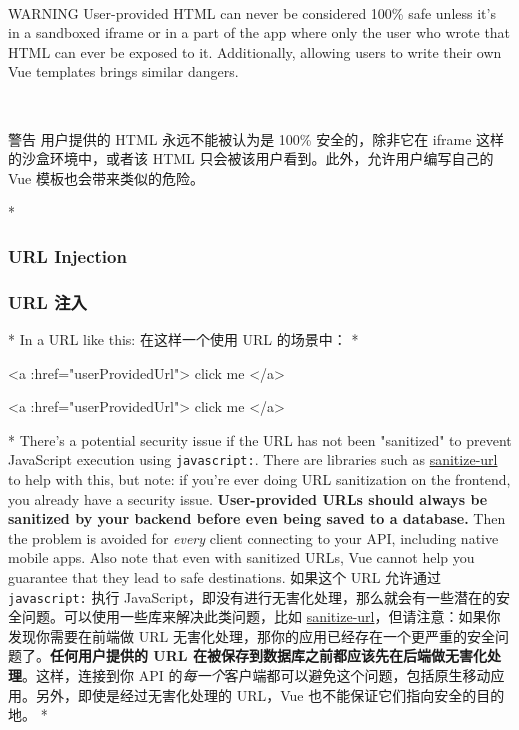\begin{paracol}{2}
~
\begin{vueQuoteWarn}{WARNING}
User-provided HTML can never be considered 100\% safe unless it's in a
sandboxed iframe or in a part of the app where only the user who wrote
that HTML can ever be exposed to it. Additionally, allowing users to
write their own Vue templates brings similar dangers.
\end{vueQuoteWarn}
\switchcolumn~
\begin{vueQuoteWarn}{警告}
用户提供的 HTML 永远不能被认为是 100\% 安全的，除非它在 iframe
这样的沙盒环境中，或者该 HTML 只会被该用户看到。此外，允许用户编写自己的
Vue 模板也会带来类似的危险。
\end{vueQuoteWarn}
\end{paracol}



\begin{paracol}{2} 
 
\switchcolumn[0]*%
\subsubsection{URL Injection}
\switchcolumn
\subsubsection{URL 注入}
\switchcolumn[0]*%
In a URL like this:
\switchcolumn
在这样一个使用 URL 的场景中：
\switchcolumn[0]*%
\begin{codeHtml}
<a :href="userProvidedUrl">
  click me
</a>
\end{codeHtml}
\switchcolumn
\begin{codeHtml}
<a :href="userProvidedUrl">
  click me
</a>
\end{codeHtml}
\switchcolumn[0]*%
There's a potential security issue if the URL has not been "sanitized"
to prevent JavaScript execution using \texttt{javascript:}. There are
libraries such as
\href{https://www.npmjs.com/package/@braintree/sanitize-url}{sanitize-url}
to help with this, but note: if you're ever doing URL sanitization on
the frontend, you already have a security issue. \textbf{User-provided
URLs should always be sanitized by your backend before even being saved
to a database.} Then the problem is avoided for \emph{every} client
connecting to your API, including native mobile apps. Also note that
even with sanitized URLs, Vue cannot help you guarantee that they lead
to safe destinations.
\switchcolumn
如果这个 URL 允许通过 \texttt{javascript:} 执行
JavaScript，即没有进行无害化处理，那么就会有一些潜在的安全问题。可以使用一些库来解决此类问题，比如
\href{https://www.npmjs.com/package/@braintree/sanitize-url}{sanitize-url}，但请注意：如果你发现你需要在前端做
URL
无害化处理，那你的应用已经存在一个更严重的安全问题了。\textbf{任何用户提供的
URL 在被保存到数据库之前都应该先在后端做无害化处理}。这样，连接到你 API
的\emph{每一个}客户端都可以避免这个问题，包括原生移动应用。另外，即使是经过无害化处理的
URL，Vue 也不能保证它们指向安全的目的地。
\switchcolumn[0]*%

\end{paracol}

